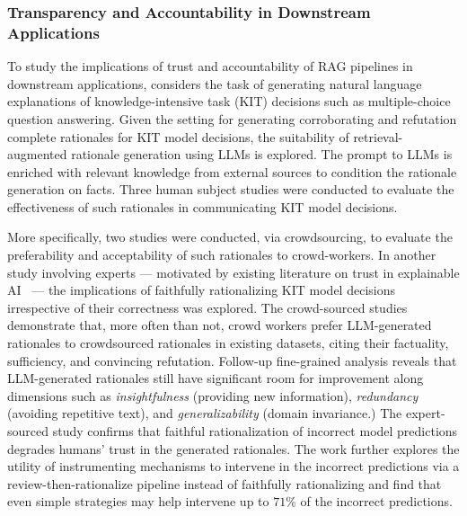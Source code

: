 \subsubsection{Transparency and Accountability in Downstream Applications}
\label{sec:rag_accountable}
To study the implications of trust and accountability of RAG pipelines in downstream applications, \cite{mishra2023characterizing} considers the task of generating natural language explanations of knowledge-intensive task (KIT) decisions such as multiple-choice question answering. Given the setting for generating corroborating and refutation complete rationales for KIT model decisions, the suitability of retrieval-augmented rationale generation using LLMs is explored. The prompt to LLMs is enriched with relevant knowledge from external sources to condition the rationale generation on facts. Three human subject studies were conducted to evaluate the effectiveness of such rationales in communicating KIT model decisions. 

More specifically, two studies were conducted, via crowdsourcing, to evaluate the preferability and acceptability of such rationales to crowd-workers. In another study involving experts --- motivated by existing literature on trust in explainable AI~\cite{hoffman2018metrics, stites2021sage} --- the implications of faithfully rationalizing KIT model decisions irrespective of their correctness was explored.
The crowd-sourced studies demonstrate that, more often than not, crowd workers prefer LLM-generated
rationales to crowdsourced rationales in existing datasets, citing their factuality, sufficiency, and convincing refutation. 
Follow-up fine-grained analysis 
reveals that LLM-generated rationales
still have significant room for improvement along
dimensions such as \emph{insightfulness} (\ie providing new information), \emph{redundancy} (\ie avoiding repetitive text), and \emph{generalizability} (\ie domain invariance.)
The expert-sourced study confirms that faithful rationalization of incorrect model predictions 
degrades humans' trust in the generated rationales. 
The work further explores the utility of instrumenting mechanisms
to intervene in the incorrect predictions via a review-then-rationalize pipeline instead of faithfully rationalizing and find that even simple strategies may help intervene up to $71\%$ of the incorrect predictions.

